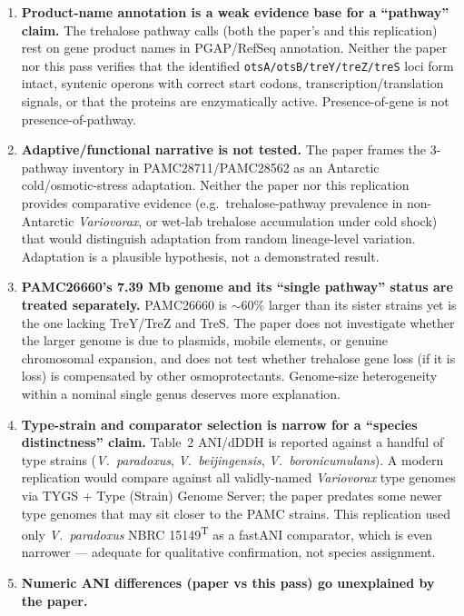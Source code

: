 \documentclass[11pt]{article}
\begin{document}
\begin{enumerate}[leftmargin=1.4em]
  \item \textbf{Product-name annotation is a weak evidence base for a ``pathway'' claim.}
        The trehalose pathway calls (both the paper's and this replication) rest on gene
        product names in PGAP/RefSeq annotation. Neither the paper nor this pass verifies
        that the identified \texttt{otsA/otsB/treY/treZ/treS} loci form intact, syntenic
        operons with correct start codons, transcription/translation signals, or that the
        proteins are enzymatically active. Presence-of-gene is not presence-of-pathway.
  \item \textbf{Adaptive/functional narrative is not tested.} The paper frames the
        3-pathway inventory in PAMC28711/PAMC28562 as an Antarctic cold/osmotic-stress
        adaptation. Neither the paper nor this replication provides comparative evidence
        (e.g.\ trehalose-pathway prevalence in non-Antarctic \emph{Variovorax}, or wet-lab
        trehalose accumulation under cold shock) that would distinguish adaptation from
        random lineage-level variation. Adaptation is a plausible hypothesis, not a
        demonstrated result.
  \item \textbf{PAMC26660's 7.39 Mb genome and its ``single pathway'' status are treated
        separately.} PAMC26660 is $\sim$60\% larger than its sister strains yet is the one
        lacking TreY/TreZ and TreS. The paper does not investigate whether the larger
        genome is due to plasmids, mobile elements, or genuine chromosomal expansion, and
        does not test whether trehalose gene loss (if it is loss) is compensated by other
        osmoprotectants. Genome-size heterogeneity within a nominal single genus deserves
        more explanation.
  \item \textbf{Type-strain and comparator selection is narrow for a ``species distinctness''
        claim.} Table~2 ANI/dDDH is reported against a handful of type strains
        (\emph{V.\ paradoxus}, \emph{V.\ beijingensis}, \emph{V.\ boronicumulans}). A modern
        replication would compare against all validly-named \emph{Variovorax} type genomes
        via TYGS + Type (Strain) Genome Server; the paper predates some newer type genomes
        that may sit closer to the PAMC strains. This replication used only
        \emph{V.\ paradoxus} NBRC 15149\textsuperscript{T} as a fastANI comparator, which is
        even narrower --- adequate for qualitative confirmation, not species assignment.
  \item \textbf{Numeric ANI differences (paper vs this pass) go unexplained by the paper.}

\end{enumerate}
\end{document}
